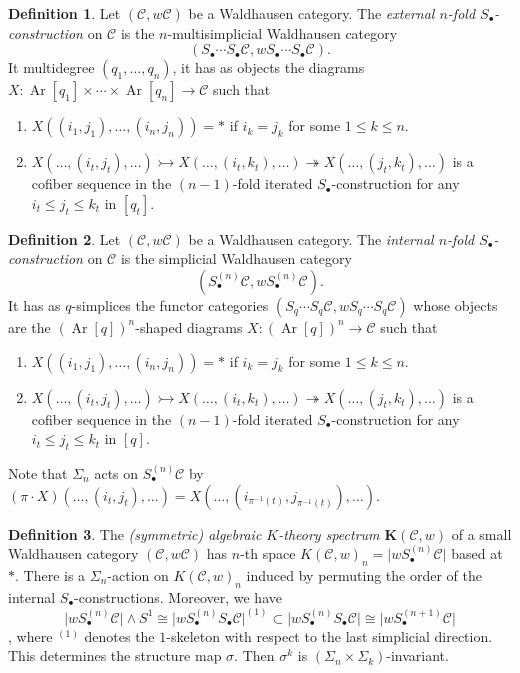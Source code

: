 \documentclass[10pt,letterpaper,cm]{nupset}
\theoremstyle{definition}
\newtheorem{definition}{Definition}
\theoremstyle{theorem}
\theoremstyle{remark}
\newcommand{\1}{\mathbf{1}}
\renewcommand{\c}{\mathscr{C}}
\newcommand{\0}{\vec 0}
\DeclareMathOperator{\Ar}{Ar}
\begin{document}
\begin{definition}
Let $(\c, w\c)$ be a Waldhausen category. The \textit{external $n$-fold $S_{\bullet}$-construction} on $\c$ is the $n$-multisimplicial Waldhausen category $$\left(S_{\bullet}\cdots S_{\bullet}\c, wS_{\bullet} \cdots S_{\bullet} \c\right).$$ It multidegree $(q_1, \ldots, q_n)$, it has as objects the diagrams  $X: \Ar[q_1] \times \cdots \times \Ar[q_n] \to \c$ such that
\begin{enumerate}
\item $X((i_1, j_1), \ldots, (i_n, j_n)) = \ast$ if $i_k = j_k$ for some $1\leq k \leq n$.
\item $X(\ldots, (i_t, j_t), \ldots) \rightarrowtail X(\ldots, (i_t, k_t), \ldots) \twoheadrightarrow X(\ldots, (j_t, k_t), \ldots)$ is a cofiber sequence  in the $(n-1)$-fold iterated $S_{\bullet}$-construction for any $i_t \leq j_t \leq k_t$ in $[q_t]$.
\end{enumerate}
\end{definition}

\begin{definition}
Let $\left(\c, w\c\right)$ be a Waldhausen category. The \textit{internal $n$-fold $S_{\bullet}$-construction} on $\c$ is the simplicial Waldhausen category $$(S_{\bullet}^{(n)}\c, wS_{\bullet}^{(n)} \c).$$ It has as $q$-simplices the functor categories $(S_q \cdots S_q \c, wS_q \cdots S_q \c)$ whose objects are the $\left(\Ar[q]\right)^n$-shaped diagrams  $X: \left(\Ar[q]\right)^n\to \c$ such that
\begin{enumerate}
\item $X((i_1, j_1), \ldots, (i_n, j_n)) = \ast$ if $i_k = j_k$ for some $1\leq k \leq n$.
\item $X(\ldots, (i_t, j_t), \ldots) \rightarrowtail X(\ldots, (i_t, k_t), \ldots) \twoheadrightarrow X(\ldots, (j_t, k_t), \ldots)$ is a cofiber sequence  in the $(n-1)$-fold iterated $S_{\bullet}$-construction for any $i_t \leq j_t \leq k_t$ in $[q]$.
\end{enumerate}
Note that $\Sigma_n$ acts on $S_{\bullet}^{(n)}\c$ by $(\pi \cdot X)(\ldots, (i_t, j_t), \ldots) = X(\ldots, (i_{\pi^{{-}1}(t)}, j_{\pi^{{-}1}(t)}), \ldots)$.
\end{definition}

\begin{definition}
The \textit{(symmetric) algebraic $K$-theory  spectrum $\mathbf{K}(\c, w)$} of a small Waldhausen category $\left(\c, w\c\right)$ has $n$-th space $K(\c, w)_n = \lvert{wS_{\bullet}^{(n)}\c}\rvert$ based at $\ast$. There is a $\Sigma_n$-action on $K(\c, w)_n$ induced by permuting the order of the internal $S_{\bullet}$-constructions. Moreover, we have $$\lvert{wS_{\bullet}^{(n)}\c}\rvert \land S^1 \cong \lvert{wS_{\bullet}^{(n)}S_{\bullet}\c}\rvert^{(1)} \subset \lvert{wS_{\bullet}^{(n)}S_{\bullet}\c}\rvert \cong \lvert{wS_{\bullet}^{(n+1)}\c}\rvert$$, where $^{(1)}$ denotes the $1$-skeleton with respect to the last simplicial direction. This determines the structure map $\sigma$. Then $\sigma^k$ is $\left(\Sigma_{n} \times \Sigma_{k}\right)$-invariant.
\end{definition}
\end{document}
